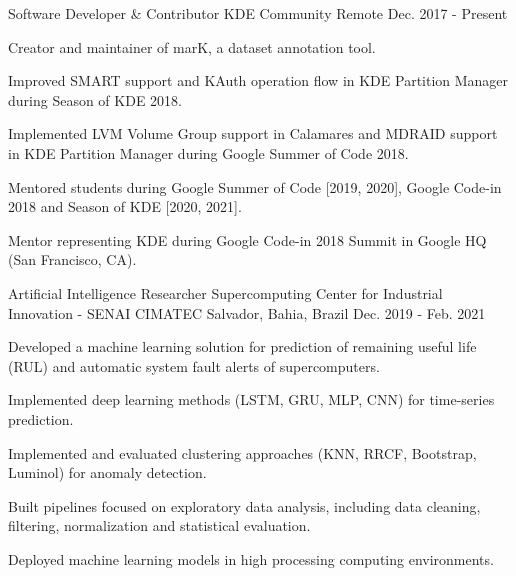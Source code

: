 \begin{cventries}
    
  \cventry
    {Software Developer \& Contributor} %
    {KDE Community} %
    {Remote} %
    {Dec. 2017 - Present} %
    {
      \begin{cvitems} %
        \item {Creator and maintainer of marK, a dataset annotation tool.}
        \item {Improved SMART support and KAuth operation flow in KDE Partition Manager during Season of KDE 2018.}
        \item {Implemented LVM Volume Group support in Calamares and MDRAID support in KDE Partition Manager during Google Summer of Code 2018.}
        \item {Mentored students during Google Summer of Code [2019, 2020], Google Code-in 2018 and Season of KDE [2020, 2021].}
        \item {Mentor representing KDE during Google Code-in 2018 Summit in Google HQ (San Francisco, CA).}
      \end{cvitems}
    }


  \cventry
    {Artificial Intelligence Researcher}
    {Supercomputing Center for Industrial Innovation - SENAI CIMATEC}
    {Salvador, Bahia, Brazil}
    {Dec. 2019 - Feb. 2021}
    {
      \begin{cvitems}
        \item {Developed a machine learning solution for prediction of remaining useful life (RUL) and automatic system fault alerts of supercomputers.}
        \item {Implemented deep learning methods (LSTM, GRU, MLP, CNN) for time-series prediction.}
        \item {Implemented and evaluated clustering approaches (KNN, RRCF, Bootstrap, Luminol) for anomaly detection.}
        \item {Built pipelines focused on exploratory data analysis, including data cleaning, filtering, normalization and statistical evaluation.}
        \item {Deployed machine learning models in high processing computing environments.}
      \end{cvitems}
    }



\end{cventries}
